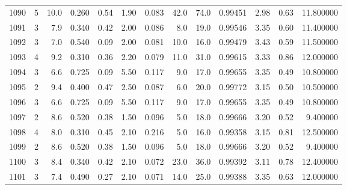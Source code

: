 \begin{tabular}{lrrrrrrrrrrrr}
1090 &        5 &           10.0 &             0.260 &         0.54 &            1.90 &      0.083 &                 42.0 &                  74.0 &  0.99451 &  2.98 &       0.63 &  11.800000 \\
1091 &        3 &            7.9 &             0.340 &         0.42 &            2.00 &      0.086 &                  8.0 &                  19.0 &  0.99546 &  3.35 &       0.60 &  11.400000 \\
1092 &        3 &            7.0 &             0.540 &         0.09 &            2.00 &      0.081 &                 10.0 &                  16.0 &  0.99479 &  3.43 &       0.59 &  11.500000 \\
1093 &        4 &            9.2 &             0.310 &         0.36 &            2.20 &      0.079 &                 11.0 &                  31.0 &  0.99615 &  3.33 &       0.86 &  12.000000 \\
1094 &        3 &            6.6 &             0.725 &         0.09 &            5.50 &      0.117 &                  9.0 &                  17.0 &  0.99655 &  3.35 &       0.49 &  10.800000 \\
1095 &        2 &            9.4 &             0.400 &         0.47 &            2.50 &      0.087 &                  6.0 &                  20.0 &  0.99772 &  3.15 &       0.50 &  10.500000 \\
1096 &        3 &            6.6 &             0.725 &         0.09 &            5.50 &      0.117 &                  9.0 &                  17.0 &  0.99655 &  3.35 &       0.49 &  10.800000 \\
1097 &        2 &            8.6 &             0.520 &         0.38 &            1.50 &      0.096 &                  5.0 &                  18.0 &  0.99666 &  3.20 &       0.52 &   9.400000 \\
1098 &        4 &            8.0 &             0.310 &         0.45 &            2.10 &      0.216 &                  5.0 &                  16.0 &  0.99358 &  3.15 &       0.81 &  12.500000 \\
1099 &        2 &            8.6 &             0.520 &         0.38 &            1.50 &      0.096 &                  5.0 &                  18.0 &  0.99666 &  3.20 &       0.52 &   9.400000 \\
1100 &        3 &            8.4 &             0.340 &         0.42 &            2.10 &      0.072 &                 23.0 &                  36.0 &  0.99392 &  3.11 &       0.78 &  12.400000 \\
1101 &        3 &            7.4 &             0.490 &         0.27 &            2.10 &      0.071 &                 14.0 &                  25.0 &  0.99388 &  3.35 &       0.63 &  12.000000 \\

\end{tabular}
